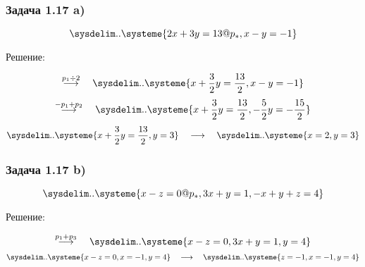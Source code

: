 \documentclass{subfiles}
\begin{document}
\subsubsection{Задача 1.17 a)}

\begin{equation*}
    \sysdelim..\systeme{
        2x + 3y = 13@p_{*},
        x - y = -1
    }
\end{equation*}

\noindent Решение:

\begin{equation*}
    \overset{p_{1} \div 2}{\longrightarrow}
    \quad
    \sysdelim..\systeme{
        x + \frac{3}{2}y = \frac{13}{2},
        x - y = -1
    }
\end{equation*}
\begin{equation*}
    \overset{-p_{1} + p_{2}}{\longrightarrow}
    \quad
    \sysdelim..\systeme{
        x + \frac{3}{2}y = \frac{13}{2},
        - \frac{5}{2}y = -\frac{15}{2}
    }
\end{equation*}
\begin{equation*}
    \sysdelim..\systeme{
        x + \frac{3}{2}y = \frac{13}{2},
        y = 3
    }
    \quad
    \longrightarrow
    \quad
    \sysdelim..\systeme{
        x = 2,
        y = 3
    }
\end{equation*}

\subsubsection{Задача 1.17 b)}

\begin{equation*}
    \sysdelim..\systeme{
        x - z = 0@p_{*},
        3x + y = 1,
        -x + y + z = 4
    }
\end{equation*}

\noindent Решение:

\begin{equation*}
    \overset{p_{1} + p_{3}}{\longrightarrow}
    \quad
    \sysdelim..\systeme{
        x - z = 0,
        3x + y = 1,
        y = 4
    }
\end{equation*}
\begin{equation*}
    \sysdelim..\systeme{
        x - z = 0,
        x = -1,
        y = 4
    }
    \quad
    \longrightarrow
    \quad
    \sysdelim..\systeme{
        z = -1,
        x = -1,
        y = 4
    }
\end{equation*}
\end{document}
